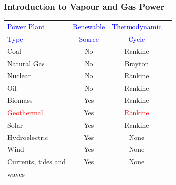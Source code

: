 \documentclass[10pt,compress,handout,ignorenonframetext]{beamer}
\begin{document}
\begin{frame}
 \frametitle{Introduction to Vapour and Gas Power}

    \begin{center}
     \begin{table}
       \begin{tabular}{l c c c}
    \hline
    \textcolor{blue}{Power Plant} & \textcolor{blue}{Renewable}  & \textcolor{blue}{Thermodynamic} \\
    \textcolor{blue}{Type}        & \textcolor{blue}{Source}     & \textcolor{blue}{Cycle}         \\
    \hline
      Coal                        &   No                         & Rankine  \\
      Natural Gas                 &   No                         & Brayton  \\
      Nuclear                     &   No                         & Rankine  \\
      Oil                         &   No                         & Rankine  \\
      Biomass                     &   Yes                        & Rankine  \\
      \textcolor{red}{Geothermal} &   Yes                        & \textcolor{red}{Rankine}  \\
      Solar                       &   Yes                        & Rankine  \\
      Hydroelectric               &   Yes                        & None     \\
      Wind                        &   Yes                        & None     \\
      Currents, tides and         &   Yes                        & None     \\
      waves                       &                              &          \\
      \end{tabular}
     \end{table}
    \end{center}
\end{frame}
\end{document}
